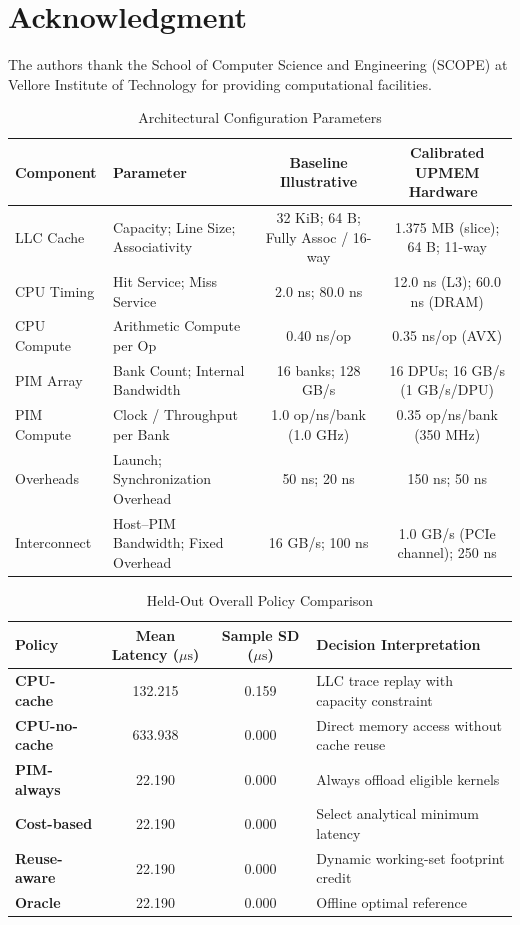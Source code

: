 \documentclass[journal,10pt,twocolumn]{IEEEtran}
\begin{document}
\section*{Acknowledgment}
The authors thank the School of Computer Science and Engineering (SCOPE) at Vellore Institute of Technology for providing computational facilities.

\begin{table}[t]
\caption{Architectural Configuration Parameters}
\label{tab:params}
\centering
\begin{tabular}{llcc}
\toprule
\textbf{Component} & \textbf{Parameter} & \textbf{Baseline Illustrative} & \textbf{Calibrated UPMEM Hardware~\cite{GomezLuna2022}} \\
\midrule
LLC Cache & Capacity; Line Size; Associativity & 32 KiB; 64 B; Fully Assoc / 16-way & 1.375 MB (slice); 64 B; 11-way \\
CPU Timing & Hit Service; Miss Service & 2.0 ns; 80.0 ns & 12.0 ns (L3); 60.0 ns (DRAM) \\
CPU Compute & Arithmetic Compute per Op & 0.40 ns/op & 0.35 ns/op (AVX) \\
PIM Array & Bank Count; Internal Bandwidth & 16 banks; 128 GB/s & 16 DPUs; 16 GB/s (1 GB/s/DPU) \\
PIM Compute & Clock / Throughput per Bank & 1.0 op/ns/bank (1.0 GHz) & 0.35 op/ns/bank (350 MHz) \\
Overheads & Launch; Synchronization Overhead & 50 ns; 20 ns & 150 ns; 50 ns \\
Interconnect & Host--PIM Bandwidth; Fixed Overhead & 16 GB/s; 100 ns & 1.0 GB/s (PCIe channel); 250 ns \\
\bottomrule
\end{tabular}
\end{table}

\begin{table}[htbp]
\caption{Held-Out Overall Policy Comparison}
\label{tab:policy_heldout}
\centering
\begin{tabular}{lccp{3.5cm}}
\toprule
\textbf{Policy} & \textbf{Mean Latency ($\mu\text{s}$)} & \textbf{Sample SD ($\mu\text{s}$)} & \textbf{Decision Interpretation} \\
\midrule
\textbf{CPU-cache} & 132.215 & 0.159 & LLC trace replay with capacity constraint \\
\textbf{CPU-no-cache} & 633.938 & 0.000 & Direct memory access without cache reuse \\
\textbf{PIM-always} & 22.190 & 0.000 & Always offload eligible kernels \\
\textbf{Cost-based} & 22.190 & 0.000 & Select analytical minimum latency \\
\textbf{Reuse-aware} & 22.190 & 0.000 & Dynamic working-set footprint credit \\
\textbf{Oracle} & 22.190 & 0.000 & Offline optimal reference \\
\bottomrule
\end{tabular}
\end{table}
\end{document}
